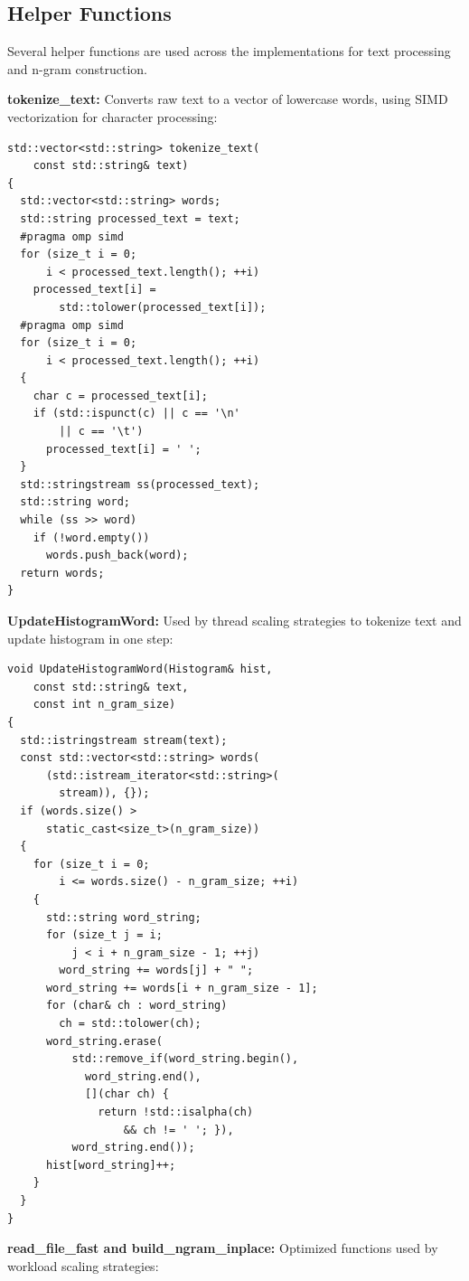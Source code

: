\documentclass[10pt,twocolumn,letterpaper]{article}
\begin{document}
\subsection{Helper Functions}

Several helper functions are used across the implementations for text processing and n-gram construction.

\textbf{tokenize\_text:} Converts raw text to a vector of lowercase words, using SIMD vectorization for character processing:

\begin{lstlisting}
std::vector<std::string> tokenize_text(
    const std::string& text)
{
  std::vector<std::string> words;
  std::string processed_text = text;
  #pragma omp simd
  for (size_t i = 0; 
      i < processed_text.length(); ++i)
    processed_text[i] = 
        std::tolower(processed_text[i]);
  #pragma omp simd
  for (size_t i = 0; 
      i < processed_text.length(); ++i)
  {
    char c = processed_text[i];
    if (std::ispunct(c) || c == '\n' 
        || c == '\t')
      processed_text[i] = ' ';
  }
  std::stringstream ss(processed_text);
  std::string word;
  while (ss >> word)
    if (!word.empty())
      words.push_back(word);
  return words;
}
\end{lstlisting}

\textbf{UpdateHistogramWord:} Used by thread scaling strategies to tokenize text and update histogram in one step:

\begin{lstlisting}
void UpdateHistogramWord(Histogram& hist, 
    const std::string& text, 
    const int n_gram_size)
{
  std::istringstream stream(text);
  const std::vector<std::string> words(
      (std::istream_iterator<std::string>(
        stream)), {});
  if (words.size() > 
      static_cast<size_t>(n_gram_size))
  {
    for (size_t i = 0; 
        i <= words.size() - n_gram_size; ++i)
    {
      std::string word_string;
      for (size_t j = i; 
          j < i + n_gram_size - 1; ++j)
        word_string += words[j] + " ";
      word_string += words[i + n_gram_size - 1];
      for (char& ch : word_string) 
        ch = std::tolower(ch);
      word_string.erase(
          std::remove_if(word_string.begin(), 
            word_string.end(),
            [](char ch) { 
              return !std::isalpha(ch) 
                  && ch != ' '; }),
          word_string.end());
      hist[word_string]++;
    }
  }
}
\end{lstlisting}

\textbf{read\_file\_fast and build\_ngram\_inplace:} Optimized functions used by workload scaling strategies:
\end{document}
